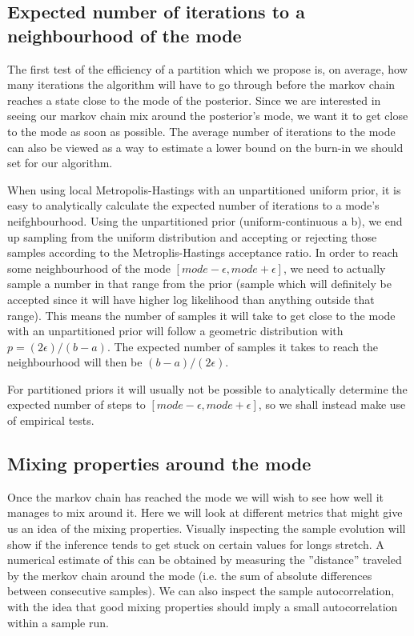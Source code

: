 \subsection{Expected number of iterations to a neighbourhood of the mode}
\label{section:sampsToMode}
The first test of the efficiency of a partition which we propose is, on average, how many iterations the algorithm will have to go through before the markov chain reaches a state close to the mode of the posterior. Since we are interested in seeing our markov chain mix around the posterior's mode, we want it to get close to the mode as soon as possible. The average number of iterations to the mode can also be viewed as a way to estimate a lower bound on the burn-in we should set for our algorithm.

When using local Metropolis-Hastings with an unpartitioned uniform prior, it is easy to analytically calculate the expected number of iterations to a mode's neifghbourhood. Using the unpartitioned prior (uniform-continuous a b), we end up sampling from the uniform distribution and accepting or rejecting those samples according to the Metroplis-Hastings acceptance ratio. In order to reach some neighbourhood of the mode $[mode - \epsilon, mode + \epsilon]$, we need to actually sample a number in that range from the prior (sample which will definitely be accepted since it will have higher log likelihood than anything outside that range). This means the number of samples it will take to get close to the mode with an unpartitioned prior will follow a geometric distribution with $p = (2\epsilon)/(b-a)$. The expected number of samples it takes to reach the neighbourhood will then be $(b-a)/(2\epsilon)$.

For partitioned priors it will usually not be possible to analytically determine the expected number of steps to $[mode - \epsilon, mode + \epsilon]$, so we shall instead make use of empirical tests.

\subsection{Mixing properties around the mode}
Once the markov chain has reached the mode we will wish to see how well it manages to mix around it. Here we will look at different metrics that might give us an idea of the mixing properties. Visually inspecting the sample evolution will show if the inference tends to get stuck on certain values for longs stretch. A numerical estimate of this can be obtained by measuring the ''distance'' traveled by the merkov chain around the mode (i.e. the sum of absolute differences between consecutive samples). We can also inspect the sample autocorrelation, with the idea that good mixing properties should imply a small autocorrelation within a sample run.


